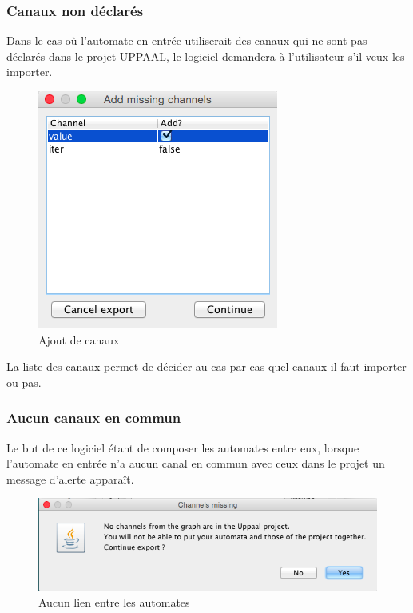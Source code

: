 \documentclass[12pt,a4paper]{report}
\begin{document}
\subsubsection*{Canaux non déclarés}

Dans le cas où l'automate en entrée utiliserait des canaux qui ne sont pas déclarés
dans le projet UPPAAL, le logiciel demandera à l'utilisateur s'il veux les importer.

\begin{figure}[h]
  \centering
  \includegraphics[scale=0.6]{ressources/gui/channels.png}
  \caption{Ajout de canaux}
\end{figure}

La liste des canaux permet de décider au cas par cas quel canaux il faut importer ou pas.

\subsubsection*{Aucun canaux en commun}
Le but de ce logiciel étant de composer les automates entre eux, lorsque l'automate en 
entrée n'a aucun canal en commun avec ceux dans le projet un message d'alerte apparaît.

\begin{figure}[h]
  \centering
  \includegraphics[scale=0.6]{ressources/gui/missing.png}
  \caption{Aucun lien entre les automates}
\end{figure}
\end{document}
